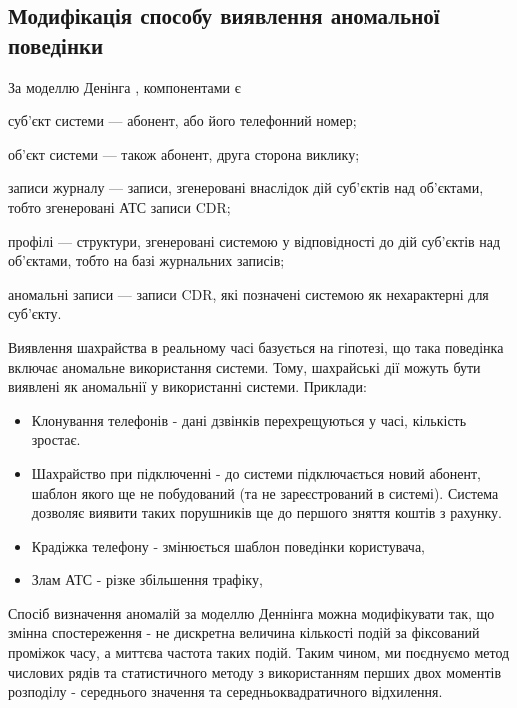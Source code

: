 \newpage
{}
\subsection{Модифікація способу виявлення аномальної поведінки}

За моделлю Денінга \cite{denning1987intrusion}, компонентами є  %

\begin{ESKDexplanation}
\item суб'єкт системи --- абонент, або його телефонний номер;
\item об'єкт системи --- також абонент, друга сторона виклику;
\item записи журналу --- записи, згенеровані внаслідок дій суб'єктів над 
      об'єктами, тобто згенеровані АТС записи CDR;
\item профілі --- структури, згенеровані системою у відповідності до дій 
      суб'єктів над об'єктами, тобто на базі журнальних записів;
\item аномальні записи --- записи CDR, які позначені системою як нехарактерні
      для суб'єкту.
\end{ESKDexplanation}

Виявлення шахрайства в реальному часі базується на гіпотезі, що така поведінка 
включає аномальне використання системи. Тому, шахрайські дії можуть бути 
виявлені як аномальнії у використанні системи. Приклади:

\begin{itemize}
  \item Клонування телефонів - дані дзвінків перехрещуються у часі, кількість 
        зростає.
  \item Шахрайство при підключенні - до системи підключається новий абонент, 
        шаблон якого ще не побудований (та не зареєстрований в системі). 
        Система дозволяє виявити таких порушників ще до першого зняття коштів з
         рахунку.
  \item Крадіжка телефону - змінюється шаблон поведінки користувача,
  \item Злам АТС - різке збільшення трафіку,
\end{itemize}

Спосіб визначення аномалій за моделлю Деннінга \cite{denning1987intrusion} можна модифікувати так, що змінна 
спостереження - не дискретна величина кількості подій за 
фіксований проміжок часу, а миттєва частота таких подій. Таким 
чином, ми поєднуємо метод числових рядів та статистичного методу
з використанням перших двох моментів розподілу - середнього 
значення та середньоквадратичного відхилення.

